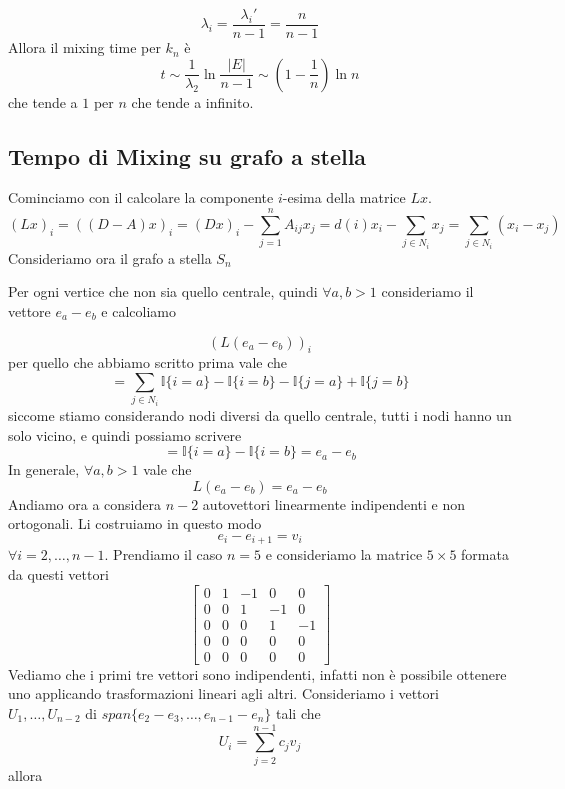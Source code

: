 \documentclass[12pt]{report}
\begin{document}
$$\lambda_i = \frac{\lambda_i'}{n-1} = \frac{n}{n-1}$$
Allora il mixing time per $k_n$ è
$$t \sim \frac{1}{\lambda_2} \ln{\frac{|E|}{n-1}} \sim (1-\frac{1}{n})\ln{n}$$
che tende a $1$ per $n$ che tende a infinito.

\subsection{Tempo di Mixing su grafo a stella}
Cominciamo con il calcolare la componente $i$-esima della matrice $Lx$.
$$(Lx)_i = ( (D-A) x)_i = (D x)_i - \sum_{j=1}^n A_{ij}x_j = d(i) x_i - \sum_{j \in N_i} x_j = \sum_{j \in N_i} (x_i - x_j)$$
Consideriamo ora il grafo a stella $S_n$

Per ogni vertice che non sia quello centrale, quindi $\forall a,b > 1$
 consideriamo il vettore $e_a - e_b$ e calcoliamo

 $$(L(e_a-e_b))_i$$
 per quello che abbiamo scritto prima vale che 
$$
   = \sum_{j \in N_i} \mathds{I}\{i = a\} - \mathds{I}\{i = b\} - \mathds{I}\{j = a\} + \mathds{I}\{j = b\}  
$$
siccome stiamo considerando nodi diversi da quello centrale, tutti i nodi hanno un solo vicino, e quindi possiamo scrivere
$$= \mathds{I}\{i = a\} - \mathds{I}\{i = b\} = e_a - e_b$$
In generale, $\forall a,b > 1$ vale che
$$L(e_a - e_b) = e_a - e_b$$
Andiamo ora a considera $n-2$ autovettori linearmente indipendenti e non ortogonali. Li costruiamo in questo modo
$$e_i - e_{i+1} = v_i$$
$\forall i = 2, \dots, n-1$. Prendiamo il caso $n = 5$ e consideriamo la matrice $5 \times 5$ formata da questi vettori
\[
    \begin{bmatrix}
        0 & 1 & -1 & 0 & 0 \\
        0 & 0 & 1 & -1 & 0 \\
        0 & 0 & 0 & 1 & -1 \\
        0 & 0 & 0 & 0 & 0 \\
        0 & 0 & 0 & 0 & 0 
    \end{bmatrix}
\]
Vediamo che i primi tre vettori sono indipendenti, infatti non è possibile ottenere uno applicando trasformazioni lineari agli altri. Consideriamo i vettori $U_1,\dots,U_{n-2}$ di $span\{e_2 - e_3,\dots,e_{n-1} - e_n\}$ tali che
$$U_i = \sum_{j = 2}^{n-1} c_j v_j$$
allora
\end{document}
